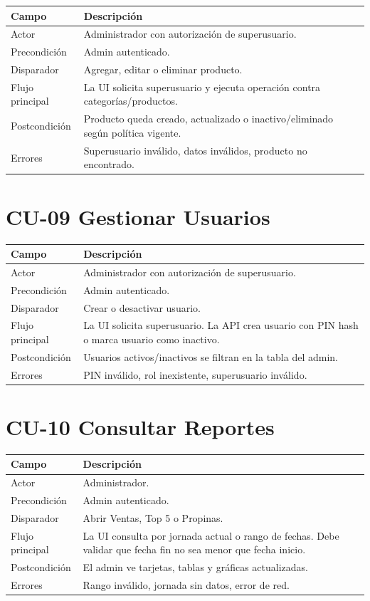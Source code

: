 \documentclass[11pt,letterpaper,openany]{report}
\begin{document}
\begin{longtable}{p{}p{}}
\toprule
\textbf{Campo} & \textbf{Descripción}\\
\midrule
Actor & Administrador con autorización de superusuario.\\
Precondición & Admin autenticado.\\
Disparador & Agregar, editar o eliminar producto.\\
Flujo principal & La UI solicita superusuario y ejecuta operación contra categorías/productos.\\
Postcondición & Producto queda creado, actualizado o inactivo/eliminado según política vigente.\\
Errores & Superusuario inválido, datos inválidos, producto no encontrado.\\
\bottomrule
\end{longtable}

\section{CU-09 Gestionar Usuarios}

\begin{longtable}{p{}p{}}
\toprule
\textbf{Campo} & \textbf{Descripción}\\
\midrule
Actor & Administrador con autorización de superusuario.\\
Precondición & Admin autenticado.\\
Disparador & Crear o desactivar usuario.\\
Flujo principal & La UI solicita superusuario. La API crea usuario con PIN hash o marca usuario como inactivo.\\
Postcondición & Usuarios activos/inactivos se filtran en la tabla del admin.\\
Errores & PIN inválido, rol inexistente, superusuario inválido.\\
\bottomrule
\end{longtable}

\section{CU-10 Consultar Reportes}

\begin{longtable}{p{}p{}}
\toprule
\textbf{Campo} & \textbf{Descripción}\\
\midrule
Actor & Administrador.\\
Precondición & Admin autenticado.\\
Disparador & Abrir Ventas, Top 5 o Propinas.\\
Flujo principal & La UI consulta por jornada actual o rango de fechas. Debe validar que fecha fin no sea menor que fecha inicio.\\
Postcondición & El admin ve tarjetas, tablas y gráficas actualizadas.\\
Errores & Rango inválido, jornada sin datos, error de red.\\
\bottomrule
\end{longtable}
\end{document}
